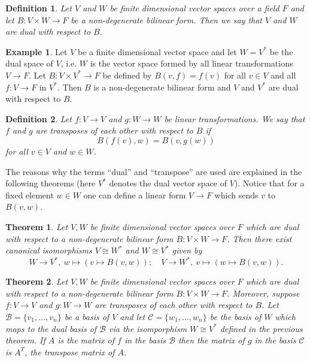 \documentclass[12pt]{article}
\newtheorem{thm}{Theorem}
\newtheorem{defn}{Definition}
\theoremstyle{definition}
\newtheorem{exa}{Example}
\begin{document}
\begin{defn}
Let $V$ and $W$ be finite dimensional vector spaces over a field $F$ and let $B:V\times W \to F$ be a non-degenerate bilinear form. Then we say that $V$ and $W$ are dual with respect to $B$.
\end{defn}

\begin{exa}
Let $V$ be a finite dimensional vector space and let $W=V^\ast$ be the dual space of $V$, i.e. $W$ is the vector space formed by all linear transformations $V\to F$. Let $B:V\times V^\ast \to F$ be defined by $B(v,f)=f(v)$ for all $v\in V$ and all $f:V\to F$ in $V^\ast$. Then $B$ is a non-degenerate bilinear form and $V$ and $V^\ast$ are dual with respect to $B$.
\end{exa}

\begin{defn}
Let $f:V\to V$ and $g:W\to W$ be linear transformations. We say that $f$ and $g$ are transposes of each other with respect to $B$ if
$$B(f(v),w)=B(v,g(w))$$
for all $v\in V$ and $w\in W$.
\end{defn}

The reasons why the terms ``dual'' and ``transpose'' are used are explained in the following theorems (here $V^\ast$ denotes the dual vector space of $V$). Notice that for a fixed element $w\in W$ one can define a linear form $V \to F$ which sends $v$ to $B(v,w)$.

\begin{thm}
Let $V,W$ be finite dimensional vector spaces over $F$ which are dual with respect to a non-degenerate bilinear form $B:V\times W \to F$. Then there exist canonical isomorphisms $V \cong W^\ast$ and $W\cong V^\ast$ given by
$$W\to V^\ast,\ w\mapsto (v\mapsto B(v,w));\quad V\to W^\ast,\ v\mapsto (w\mapsto B(v,w)).$$
\end{thm}

\begin{thm}
Let $V,W$ be finite dimensional vector spaces over $F$ which are dual with respect to a non-degenerate bilinear form $B:V\times W \to F$. Moreover, suppose $f:V\to V$ and $g:W\to W$ are transposes of each other with respect to $B$. Let $\mathcal{B}=\{v_1,\ldots,v_n\}$ be a basis of $V$ and let $\mathcal{C}=\{w_1,\ldots,w_n\}$ be the basis of $W$ which maps to the dual basis of $\mathcal{B}$ via the isomporphism $W\cong V^\ast$ defined in the previous theorem. If $A$ is the matrix of $f$ in the basis $\mathcal{B}$ then the matrix of $g$ in the basis $\mathcal{C}$ is $A^T$, the transpose matrix of $A$.
\end{thm}
\end{document}
